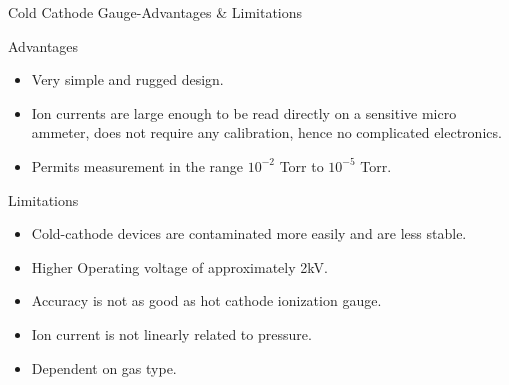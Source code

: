 \documentclass[11pt]{beamer}
\begin{document}
\begin{frame}{Cold Cathode Gauge-Advantages \& Limitations }

       \begin{exampleblock}{Advantages}
          \begin{itemize}
           
           \item Very simple and rugged design.
           \item Ion currents are large enough to be read directly on a sensitive micro ammeter, does not require any calibration, hence no complicated electronics.
           \item Permits measurement in the range $10^{-2}$ Torr to $10^{-5}$ Torr.
     
          \end{itemize}
        
       
       \end{exampleblock}
       
       \begin{exampleblock}{Limitations}
          \begin{itemize}
           
           \item Cold-cathode devices are contaminated more easily and are less stable.
           \item Higher Operating voltage of approximately 2kV.
           \item Accuracy is not as good as hot cathode ionization gauge.
 			\item Ion current is not linearly related to pressure.
 			\item Dependent on gas type.
          \end{itemize}
        
       
       \end{exampleblock}


     

\end{frame}
\end{document}
